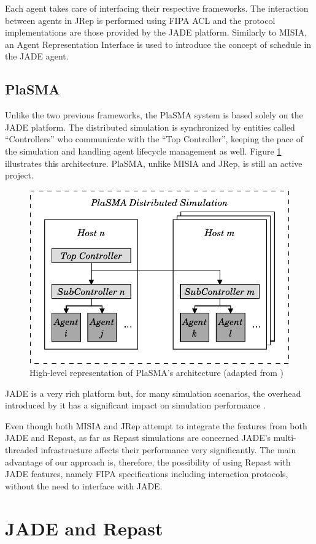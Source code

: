 Each agent takes care of interfacing their respective frameworks. The interaction between agents in JRep is performed using FIPA ACL and the protocol implementations are those provided by the JADE platform. Similarly to MISIA, an Agent Representation Interface is used to introduce the concept of schedule in the JADE agent.

\subsection{PlaSMA}
Unlike the two previous frameworks, the PlaSMA system is based solely on the JADE platform. The distributed simulation is synchronized by entities called ``Controllers'' who communicate with the ``Top Controller'', keeping the pace of the simulation and handling agent lifecycle management as well. Figure \ref{fig:plasma} illustrates this architecture. PlaSMA, unlike MISIA and JRep, is still an active project.

\begin{figure}[h]
	\centering
	\includegraphics[width=0.5\linewidth]{figures/PlaSMA.pdf}
	\caption[PlaSMA's architecture]{High-level representation of PlaSMA's architecture (adapted from \cite{warden2010towards})}
	\label{fig:plasma}
\end{figure}

JADE is a very rich platform but, for many simulation scenarios, the overhead introduced by it has a significant impact on simulation performance \cite{mengistu2008scalability}.

Even though both MISIA and JRep attempt to integrate the features from both JADE and Repast, as far as Repast simulations are concerned JADE's multi-threaded infrastructure affects their performance very significantly. The main advantage of our approach is, therefore, the possibility of using Repast with JADE features, namely FIPA specifications including interaction protocols, without the need to interface with JADE. 

\section{JADE and Repast}
\label{sec:jade-repast}

